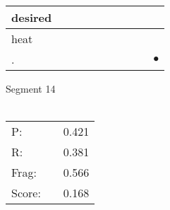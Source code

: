 \documentclass[landscape]{article}
\newcommand{\ssp}{\hspace{2pt}}
\newcommand{\mex}{\cellcolor{g}$\bullet$}
\begin{document}
\begin{tabular}{|l|p{10pt}|p{10pt}|p{10pt}|p{10pt}|p{10pt}|p{10pt}|p{10pt}|p{10pt}|p{10pt}|}
\hline
\ssp desired \ssp&\hspace{2pt}&\hspace{2pt}&\hspace{2pt}&\hspace{2pt}&\hspace{2pt}&\hspace{2pt}&\hspace{2pt}&\hspace{2pt}&\hspace{2pt}\\
\hline
\ssp heat \ssp&\hspace{2pt}&\hspace{2pt}&\hspace{2pt}&\hspace{2pt}&\hspace{2pt}&\hspace{2pt}&\hspace{2pt}&\hspace{2pt}&\hspace{2pt}\\
\hline
\ssp \cellcolor{ref8}. \ssp&\hspace{2pt}&\hspace{2pt}&\hspace{2pt}&\hspace{2pt}&\hspace{2pt}&\hspace{2pt}&\hspace{2pt}&\hspace{2pt}&\hspace{2pt}\mex\\
\hline
\end{tabular}

\vspace{6pt}
\noindent Segment 14\\\\
\noindent\begin{tabular}{lm{12pt}r}
\hline
P:&&0.421\\
R:&&0.381\\
Frag:&&0.566\\
Score:&&0.168\\
\end{tabular}

\newpage
\end{document}

